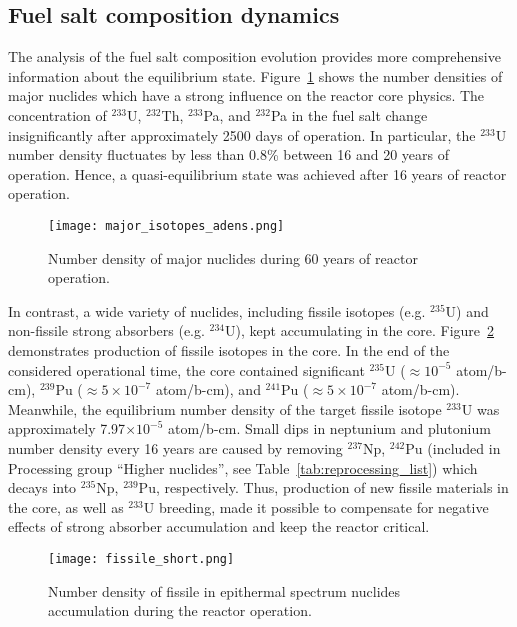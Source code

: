 \subsection{Fuel salt composition dynamics}
The analysis of the fuel salt composition evolution provides more comprehensive 
information about the equilibrium state. Figure~\ref{fig:adens_eq} shows the number 
densities of major nuclides which have a strong influence on the reactor core 
physics. The concentration of $^{233}$U, $^{232}$Th, $^{233}$Pa, and $^{232}$Pa in 
the fuel salt change insignificantly after approximately 2500 days of operation. 
In particular, the $^{233}$U number density fluctuates by less than 0.8\% between
 16 and 20 years of operation. Hence, a quasi-equilibrium state was 
achieved after 16 years of reactor operation.
\begin{figure}[ht!] %
  \centering
  \texttt{[image: major\_isotopes\_adens.png]}
  \caption{Number density of major nuclides during 60 years of reactor 
  operation.}
  \label{fig:adens_eq}
\end{figure}
In contrast, a wide variety of nuclides, including fissile isotopes (e.g. 
$^{235}$U) and non-fissile strong absorbers (e.g. $^{234}$U), kept accumulating 
in the core. Figure~\ref{fig:fissile_short} demonstrates production of fissile 
isotopes in the core. In the end of the considered operational time, the core 
contained significant $^{235}$U ($\approx10^{-5}$ atom/b-cm), $^{239}$Pu 
($\approx5\times10^{-7}$ atom/b-cm), and $^{241}$Pu ($\approx 5\times10^{-7}$ 
atom/b-cm). Meanwhile, the equilibrium number density of the target fissile 
isotope $^{233}$U was approximately 7.97$\times10^{-5}$ atom/b-cm. Small dips 
in neptunium and plutonium number density every 16 years are caused by removing
$^{237}$Np, $^{242}$Pu (included in Processing group ``Higher nuclides'', see
 Table~\ref{tab:reprocessing_list}) which decays into $^{235}$Np, $^{239}$Pu, 
 respectively. Thus, 
production of new fissile materials in the core, as well as $^{233}$U breeding, 
made it possible to compensate for negative effects of strong absorber 
accumulation and keep the reactor critical.
\begin{figure}[htp!] %
  \centering
  \texttt{[image: fissile\_short.png]}
  \caption{Number density of fissile in epithermal spectrum nuclides 
  accumulation during the reactor operation.}
  \label{fig:fissile_short}
\end{figure}

